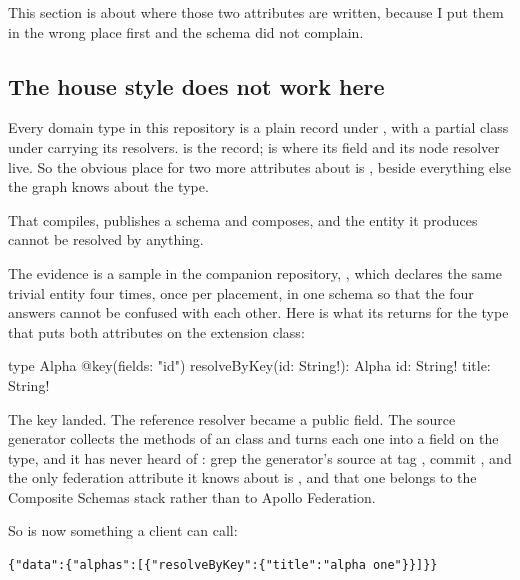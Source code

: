 This section is about where those two attributes are written, because I put them
in the wrong place first and the schema did not complain.

\subsection*{The house style does not work here}

%
Every domain type in this repository is a plain record under ,
with a partial class under  carrying its resolvers.
 is the record;  is where its  field
and its node resolver live. So the obvious place for two more attributes about
 is , beside everything else the graph knows
about the type.

That compiles, publishes a schema and composes, and the entity it produces
cannot be resolved by anything.

%
The evidence is a sample in the companion repository,
, which declares the same trivial
entity four times, once per placement, in one schema so that the four answers
cannot be confused with each other. Here is what its  returns
for the type that puts both attributes on the extension class:

\begin{graphqlsdl}
type Alpha @key(fields: "id") {
  resolveByKey(id: String!): Alpha
  id: String!
  title: String!
}
\end{graphqlsdl}

%
The key landed. The reference resolver became a public field. The source
generator collects the methods of an \code{[ObjectType<T>]} class and turns each
one into a field on the type, and it has never heard of
\code{[ReferenceResolver]}: grep the generator's source at tag ,
commit , and the only federation attribute it knows about is
, and that one belongs to the Composite Schemas stack rather
than to Apollo Federation.

So  is now something a client can call:

\begin{verbatim}
{"data":{"alphas":[{"resolveByKey":{"title":"alpha one"}}]}}
\end{verbatim}

